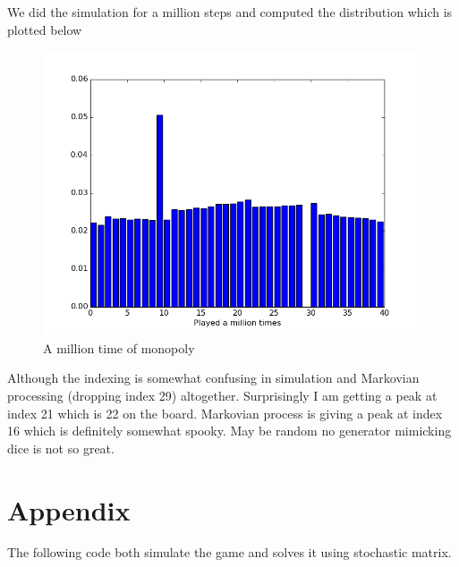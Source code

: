 \documentclass[]{article}
\begin{document}
We did the simulation for a million steps and computed the distribution
which is plotted below

\begin{figure}[htbp]
\centering
\includegraphics{./monopoly.png}
\caption{A million time of monopoly}
\end{figure}

Although the indexing is somewhat confusing in simulation and Markovian
processing (dropping index 29) altogether. Surprisingly I am getting a
peak at index 21 which is 22 on the board. Markovian process is giving a
peak at index 16 which is definitely somewhat spooky. May be random no
generator mimicking dice is not so great.

\section{Appendix}\label{appendix}

The following code both simulate the game and solves it using stochastic
matrix.

\begin{scriptsize}
    
\end{scriptsize}
\end{document}
